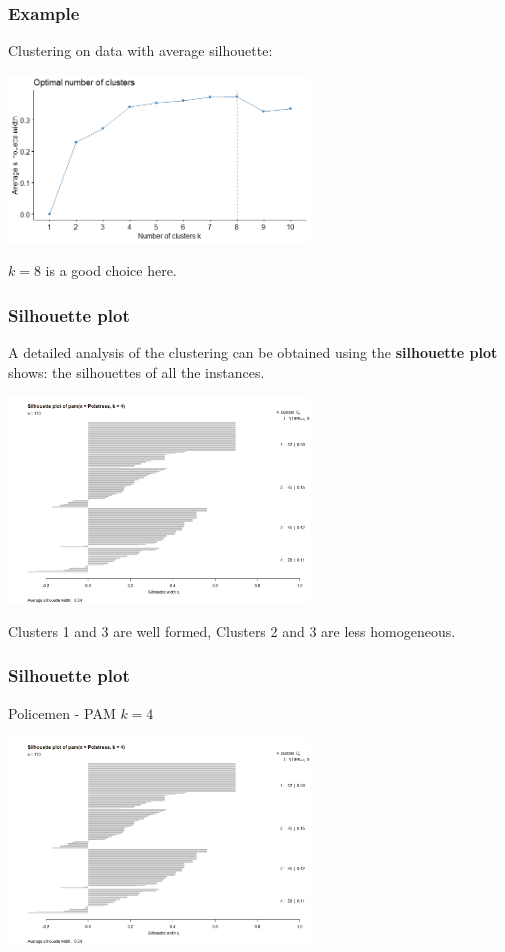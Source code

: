\begin{frame}
\frametitle{Example}
Clustering on data with average silhouette:
\begin{center}
\includegraphics[width=8cm]{../../Graphs/Nb_pam_sil.png}
\end{center}
$k=8$ is a good choice here.
\end{frame}
\begin{frame}
\frametitle{Silhouette plot}
A detailed analysis of the clustering can be obtained using the {\bf silhouette plot} shows: the silhouettes of all the instances.
\begin{center}
\includegraphics[width=8cm]{../../Graphs/Polstress-silhou.png}
\end{center}
Clusters 1 and 3 are well formed, Clusters 2 and 3 are less homogeneous. 
\end{frame}
\begin{frame}
\frametitle{Silhouette plot}
Policemen - PAM $k=4$ 
\begin{center}
\includegraphics[width=8cm]{../../Graphs/Polstress-silhou.png}
\end{center}
\end{frame}
